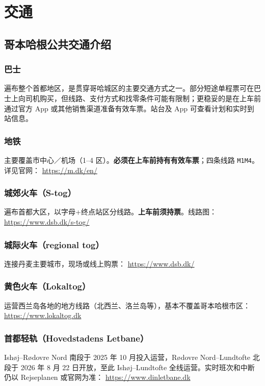 \section{交通}\label{sec:traffic}

\subsection{哥本哈根公共交通介绍}

\subsubsection{巴士}
遍布整个首都地区，是贯穿哥哈城区的主要交通方式之一。部分短途单程票可在巴士上向司机购买，但线路、支付方式和找零条件可能有限制；更稳妥的是在上车前通过官方 App 或其他销售渠道准备有效车票。站台及 App 可查看计划和实时到站信息。

\subsubsection{地铁}
主要覆盖市中心／机场（1–4 区）。\textbf{必须在上车前持有有效车票}；四条线路 \texttt{M1\textendash M4}。详见官网：
\url{https://m.dk/en/}

\subsubsection{城郊火车（S-tog）}
遍布首都大区，以字母+终点站区分线路。\textbf{上车前须持票}。线路图：
\url{https://www.dsb.dk/s-tog/}

\subsubsection{城际火车（regional tog）}
连接丹麦主要城市，现场或线上购票：
\url{https://www.dsb.dk/}

\subsubsection{黄色火车（Lokaltog）}
运营西兰岛各地的地方线路（北西兰、洛兰岛等），基本不覆盖哥本哈根市区：\url{https://www.lokaltog.dk}

\subsubsection{首都轻轨（Hovedstadens Letbane）}
Ishøj--Rødovre Nord 南段于 2025 年 10 月投入运营，Rødovre Nord--Lundtofte 北段于 2026 年 8 月 22 日开放，至此 Ishøj--Lundtofte 全线运营。实时班次和中断仍以 Rejseplanen 或官网为准：
\url{https://www.dinletbane.dk}

